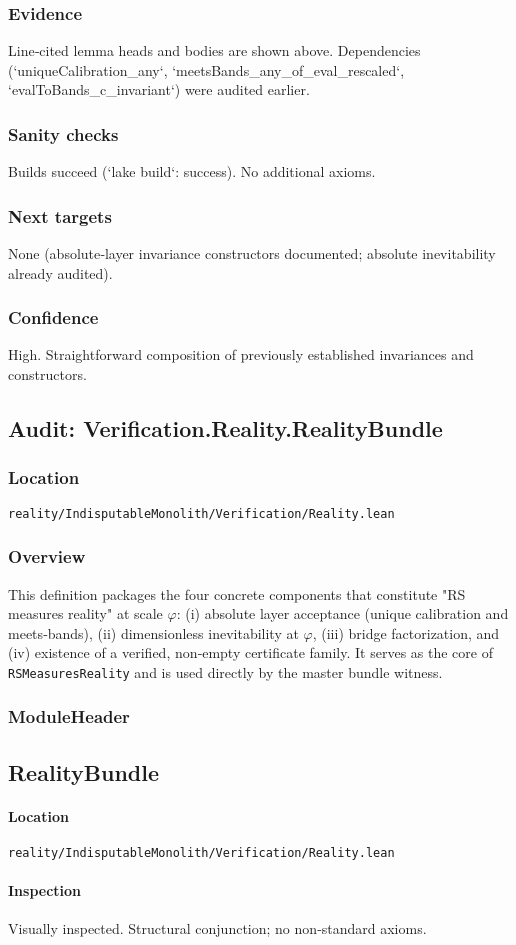 \documentclass{article}
\newcommand{\FileRef}[1]{\texttt{#1}}
\newcommand{\ModuleHeader}[3]{%
  \subsection{#1}
  \paragraph{Location} \FileRef{#2}\\
  \paragraph{Inspection} #3
}
\begin{document}
\subsubsection{Evidence}
Line‑cited lemma heads and bodies are shown above. Dependencies (`uniqueCalibration_any`, `meetsBands_any_of_eval_rescaled`, `evalToBands_c_invariant`) were audited earlier.

\subsubsection{Sanity checks}
Builds succeed (`lake build`: success). No additional axioms.

\subsubsection{Next targets}
None (absolute‑layer invariance constructors documented; absolute inevitability already audited).

\subsubsection{Confidence}
High. Straightforward composition of previously established invariances and constructors.

\subsection{Audit: Verification.Reality.RealityBundle}
\subsubsection{Location}
\FileRef{reality/IndisputableMonolith/Verification/Reality.lean}

\subsubsection{Overview}
This definition packages the four concrete components that constitute "RS measures reality" at scale \(\varphi\): (i) absolute layer acceptance (unique calibration and meets‑bands), (ii) dimensionless inevitability at \(\varphi\), (iii) bridge factorization, and (iv) existence of a verified, non‑empty certificate family. It serves as the core of \texttt{RSMeasuresReality} and is used directly by the master bundle witness.

\subsubsection{ModuleHeader}
\ModuleHeader{RealityBundle}{reality/IndisputableMonolith/Verification/Reality.lean}{Visually inspected. Structural conjunction; no non‑standard axioms.}
\end{document}
